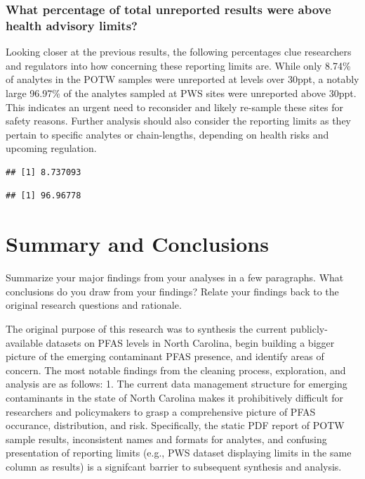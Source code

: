 \documentclass[
  12pt,
]{article}
\begin{document}
\hypertarget{what-percentage-of-total-unreported-results-were-above-health-advisory-limits}{%
\subsubsection{What percentage of total unreported results were above
health advisory
limits?}\label{what-percentage-of-total-unreported-results-were-above-health-advisory-limits}}

Looking closer at the previous results, the following percentages clue
researchers and regulators into how concerning these reporting limits
are. While only 8.74\% of analytes in the POTW samples were unreported
at levels over 30ppt, a notably large 96.97\% of the analytes sampled at
PWS sites were unreported above 30ppt. This indicates an urgent need to
reconsider and likely re-sample these sites for safety reasons. Further
analysis should also consider the reporting limits as they pertain to
specific analytes or chain-lengths, depending on health risks and
upcoming regulation.

\begin{verbatim}
## [1] 8.737093
\end{verbatim}

\begin{verbatim}
## [1] 96.96778
\end{verbatim}

\newpage

\hypertarget{summary-and-conclusions}{%
\section{Summary and Conclusions}\label{summary-and-conclusions}}

Summarize your major findings from your analyses in a few paragraphs.
What conclusions do you draw from your findings? Relate your findings
back to the original research questions and rationale.

The original purpose of this research was to synthesis the current
publicly-available datasets on PFAS levels in North Carolina, begin
building a bigger picture of the emerging contaminant PFAS presence, and
identify areas of concern. The most notable findings from the cleaning
process, exploration, and analysis are as follows: 1. The current data
management structure for emerging contaminants in the state of North
Carolina makes it prohibitively difficult for researchers and
policymakers to grasp a comprehensive picture of PFAS occurance,
distribution, and risk. Specifically, the static PDF report of POTW
sample results, inconsistent names and formats for analytes, and
confusing presentation of reporting limits (e.g., PWS dataset displaying
limits in the same column as results) is a signifcant barrier to
subsequent synthesis and analysis.
\end{document}
